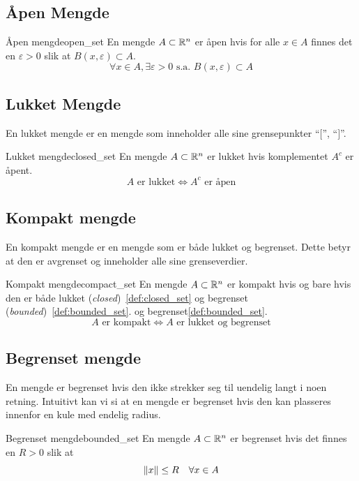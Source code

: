\subsection{Åpen Mengde}

\begin{definition}{Åpen mengde}{open_set}
	En mengde \(A \subset \mathbb{R}^n\) er åpen hvis for alle \(x \in A\) finnes det en \(\varepsilon > 0\) slik at \(B(x, \varepsilon) \subset A\).
	\[
		\forall x \in A, \exists \varepsilon > 0 \text{ s.a. } B(x, \varepsilon) \subset A
	\]
\end{definition}

\subsection{Lukket Mengde}
En lukket mengde er en mengde som inneholder alle sine grensepunkter \enquote{\( [ \)}, \enquote{\( ] \)}.
\begin{definition}{Lukket mengde}{closed_set}
	En mengde \(A \subset \mathbb{R}^n\) er lukket hvis komplementet \(A^c\) er åpent.
	\[
		A \text{ er lukket} \Leftrightarrow A^c \text{ er åpen}
	\]
\end{definition}

\subsection{Kompakt mengde}
En kompakt mengde er en mengde som er både lukket og begrenset. Dette betyr at den er avgrenset og inneholder alle sine grenseverdier.

\begin{definition}{Kompakt mengde}{compact_set}
	En mengde \(A \subset \mathbb{R}^n\) er kompakt hvis og bare hvis den er både lukket (\emph{closed})~\ref{def:closed_set} og begrenset (\emph{bounded})~\ref{def:bounded_set}.
	og begrenset\ref{def:bounded_set}.
	\[
		A \text{ er kompakt} \Leftrightarrow A \text{ er lukket og begrenset}
	\]
\end{definition}

\subsection{Begrenset mengde}
En mengde er begrenset hvis den ikke strekker seg til uendelig langt i noen retning.
Intuitivt kan vi si at en mengde er begrenset hvis den kan plasseres innenfor en kule med endelig radius.

\begin{definition}{Begrenset mengde}{bounded_set}
	En mengde \(A \subset \mathbb{R}^n\) er begrenset hvis det finnes en \(R > 0\) slik at
	\[
		\lVert x\rVert \leq R \quad \forall x \in A
	\]
\end{definition}

